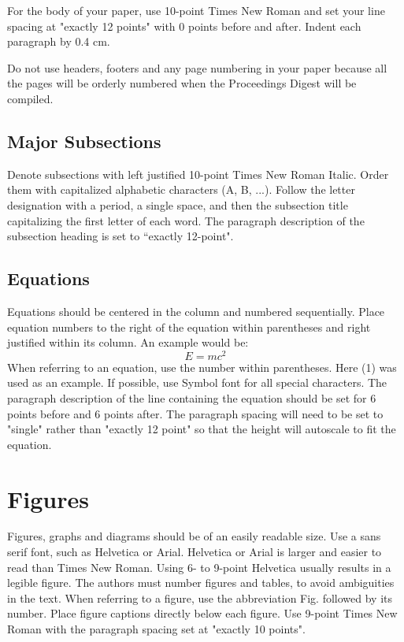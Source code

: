 \documentclass[10pt,a4paper]{article}
\begin{document}
For the body of your paper, use 10-point Times New Roman and set your line spacing at "exactly 12 points" with 0 points before and after. Indent each paragraph by 0.4 cm.

Do not use headers, footers and any page numbering in your paper because all the pages will be orderly numbered when the Proceedings Digest will be compiled.


\subsection{Major Subsections}
Denote subsections with left justified 10-point Times New Roman Italic. Order them with capitalized alphabetic characters (A, B, ...). Follow the letter designation with a period, a single space, and then the subsection title capitalizing the first letter of each word. The paragraph description of the subsection heading is set to ``exactly 12-point".


\subsection{Equations}
Equations should be centered in the column and numbered sequentially. Place equation numbers to the right of the equation within parentheses and right justified within its column. An example would be:
\begin{equation}
E = m c^2
\end{equation}
%
When referring to an equation, use the number within parentheses. Here (1) was used as an example. If possible, use Symbol font for all special characters. The paragraph description of the line containing the equation should be set for 6 points before and 6 points after. The paragraph spacing will need to be set to "single" rather than "exactly 12 point" so that the height will autoscale to fit the equation.

\section{Figures}
Figures, graphs and diagrams should be of an easily readable size. Use a sans serif font, such as Helvetica or Arial. Helvetica or Arial is larger and easier to read than Times New Roman. Using 6- to 9-point Helvetica usually results in a legible figure. The authors must number figures and tables, to avoid ambiguities in the text. When referring to a figure, use the abbreviation Fig. followed by its number. Place figure captions directly below each figure. Use 9-point Times New Roman with the paragraph spacing set at "exactly 10 points".
\end{document}
